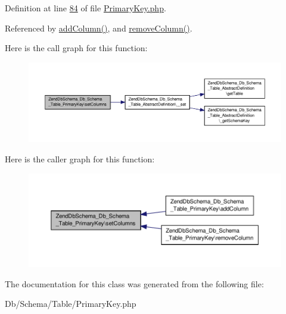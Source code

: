 Definition at line \hyperlink{PrimaryKey_8php_source_l00084}{84} of file \hyperlink{PrimaryKey_8php_source}{Primary\-Key.\-php}.



Referenced by \hyperlink{PrimaryKey_8php_source_l00107}{add\-Column()}, and \hyperlink{PrimaryKey_8php_source_l00134}{remove\-Column()}.



Here is the call graph for this function\-:\nopagebreak
\begin{figure}[H]
\begin{center}
\leavevmode
\includegraphics[width=350pt]{classZendDbSchema__Db__Schema__Table__PrimaryKey_a01cfcffd92c38bc521628d49d5c74927_cgraph}
\end{center}
\end{figure}




Here is the caller graph for this function\-:\nopagebreak
\begin{figure}[H]
\begin{center}
\leavevmode
\includegraphics[width=350pt]{classZendDbSchema__Db__Schema__Table__PrimaryKey_a01cfcffd92c38bc521628d49d5c74927_icgraph}
\end{center}
\end{figure}




The documentation for this class was generated from the following file\-:\begin{DoxyCompactItemize}
\item 
Db/\-Schema/\-Table/Primary\-Key.\-php\end{DoxyCompactItemize}

